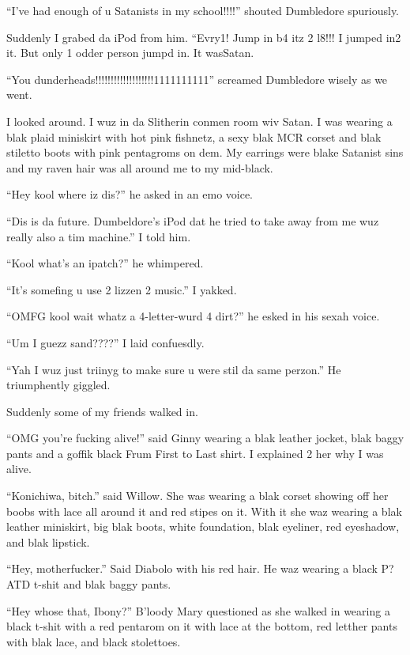 \enquote{I've had enough of u Satanists in my school!!!!} shouted Dumbledore spuriously.

Suddenly I grabed da iPod from him. ``Evry1! Jump in b4 itz 2 l8!!! I jumped in2 it. But only 1 odder person jumpd in. It was\dotfill Satan.

\enquote{You dunderheads!!!!!!!!!!!!!!!!!!!1111111111} screamed Dumbledore wisely as we went.

I looked around. I wuz in da Slitherin conmen room wiv Satan. I was wearing a blak plaid miniskirt with hot pink fishnetz, a sexy blak MCR corset and blak stiletto boots with pink pentagroms on dem. My earrings were blake Satanist sins and my raven hair was all around me to my mid-black.

\enquote{Hey kool where iz dis?} he asked in an emo voice.

\enquote{Dis is da future. Dumbeldore's iPod dat he tried to take away from me wuz really also a tim machine.} I told him.

\enquote{Kool what's an ipatch?} he whimpered.

\enquote{It's somefing u use 2 lizzen 2 music.} I yakked.

\enquote{OMFG kool wait whatz a 4-letter-wurd 4 dirt?} he esked in his sexah voice.

\enquote{Um I guezz sand????} I laid confuesdly.

\enquote{Yah I wuz just triinyg to make sure u were stil da same perzon.} He triumphently giggled.

Suddenly some of my friends walked in.

\enquote{OMG you're fucking alive!} said Ginny wearing a blak leather jocket, blak baggy pants and a goffik black Frum First to Last shirt. I explained 2 her why I was alive.

\enquote{Konichiwa, bitch.} said Willow. She was wearing a blak corset showing off her boobs with lace all around it and red stipes on it. With it she waz wearing a blak leather miniskirt, big blak boots, white foundation, blak eyeliner, red eyeshadow, and blak lipstick.

\enquote{Hey, motherfucker.} Said Diabolo with his red hair. He waz wearing a black P?ATD t-shit and blak baggy pants.

\begin{sloppypar}
    \enquote{Hey whose that, Ibony?} B'loody Mary questioned as she walked in wearing a black t-shit with a red pentarom on it with lace at the bottom, red letther pants with blak lace, and black stolettoes.
\end{sloppypar}


